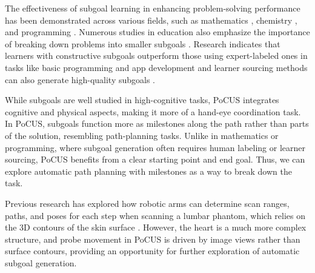 The effectiveness of subgoal learning in enhancing problem-solving performance has been demonstrated across various fields, such as mathematics \cite{atkinson2003aiding, catrambone1998subgoal, margulieux2018varying}, chemistry \cite{margulieux2018varying}, and programming \cite{margulieux2018varying, margulieux2019finding, margulieux2012subgoal, morrison2020curious, morrison2015subgoals}. Numerous studies in education also emphasize the importance of breaking down problems into smaller subgoals \cite{de2009teaching, guzdial1998supporting, hu2013process, koedinger2013using}. Research indicates that learners with constructive subgoals outperform those using expert-labeled ones in tasks like basic programming and app development \cite{margulieux2019finding, morrison2020curious, morrison2015subgoals} and learner sourcing methods can also generate high-quality subgoals \cite{jin2024codetree, choi2022algosolve}.

While subgoals are well studied in high-cognitive tasks, PoCUS integrates cognitive and physical aspects, making it more of a hand-eye coordination task. In PoCUS, subgoals function more as milestones along the path rather than parts of the solution, resembling path-planning tasks. Unlike in mathematics or programming, where subgoal generation often requires human labeling or learner sourcing, PoCUS benefits from a clear starting point and end goal. Thus, we can explore automatic path planning with milestones as a way to break down the task.

Previous research has explored how robotic arms can determine scan ranges, paths, and poses for each step when scanning a lumbar phantom, which relies on the 3D contours of the skin surface \cite{huang2019robotic}. However, the heart is a much more complex structure, and probe movement in PoCUS is driven by image views rather than surface contours, providing an opportunity for further exploration of automatic subgoal generation.